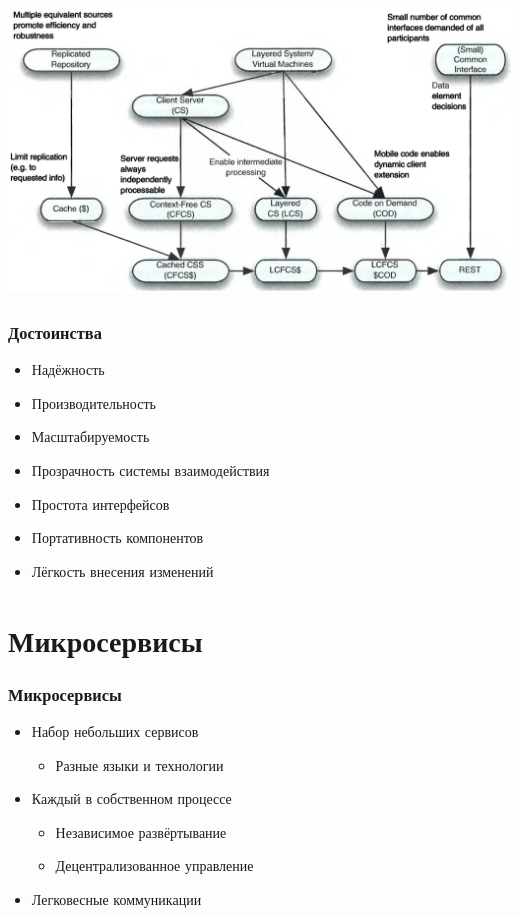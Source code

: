 \documentclass[xetex,mathserif,serif]{beamer}
\begin{document}
	\begin{frame}
		\begin{center}
			\includegraphics[width=\textwidth]{rest.png}
		\end{center}
	\end{frame}

	\begin{frame}
		\frametitle{Достоинства}
		\begin{itemize}
			\item Надёжность
			\item Производительность
			\item Масштабируемость
			\item Прозрачность системы взаимодействия
			\item Простота интерфейсов
			\item Портативность компонентов
			\item Лёгкость внесения изменений
		\end{itemize}
	\end{frame}

	\section{Микросервисы}

	\begin{frame}
		\frametitle{Микросервисы}
		\begin{itemize}
			\item Набор небольших сервисов
			\begin{itemize}
				\item Разные языки и технологии
			\end{itemize}
			\item Каждый в собственном процессе
			\begin{itemize}
				\item Независимое развёртывание
				\item Децентрализованное управление
			\end{itemize}
			\item Легковесные коммуникации
		\end{itemize}
	\end{frame}
\end{document}
